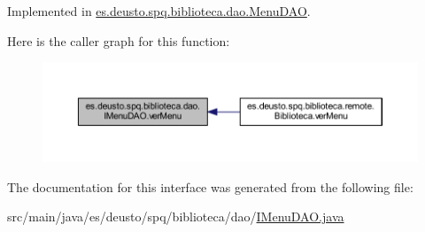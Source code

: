 Implemented in \mbox{\hyperlink{classes_1_1deusto_1_1spq_1_1biblioteca_1_1dao_1_1_menu_d_a_o_ae05c2b05b530f98bcfc8ad1146f4efd7}{es.\+deusto.\+spq.\+biblioteca.\+dao.\+Menu\+D\+AO}}.

Here is the caller graph for this function\+:
\nopagebreak
\begin{figure}[H]
\begin{center}
\leavevmode
\includegraphics[width=350pt]{interfacees_1_1deusto_1_1spq_1_1biblioteca_1_1dao_1_1_i_menu_d_a_o_ac92176efdcf5f320225152392db8cb8a_icgraph}
\end{center}
\end{figure}


The documentation for this interface was generated from the following file\+:\begin{DoxyCompactItemize}
\item 
src/main/java/es/deusto/spq/biblioteca/dao/\mbox{\hyperlink{_i_menu_d_a_o_8java}{I\+Menu\+D\+A\+O.\+java}}\end{DoxyCompactItemize}
